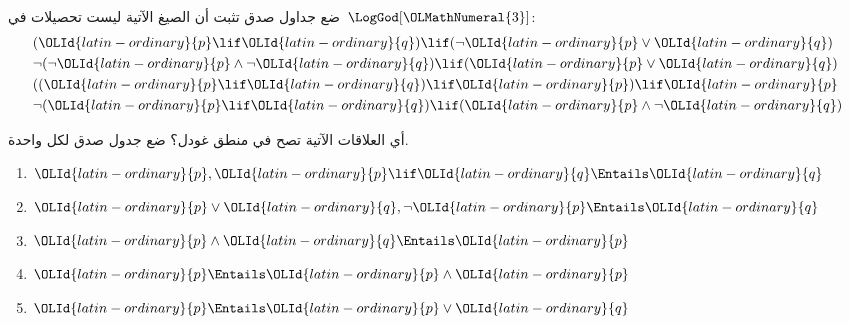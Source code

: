 \documentclass[../../../include/open-logic-section]{subfiles}
\begin{document}
\begin{prob}
  ضع جداول صدق تثبت أن الصيغ الآتية ليست تحصيلات في~$\LogGod[\OLMathNumeral{3}]$:
  \begin{align*}
    & (\OLId{latin-ordinary}{p} \lif \OLId{latin-ordinary}{q}) \lif (\lnot \OLId{latin-ordinary}{p} \lor \OLId{latin-ordinary}{q}) \\
    & \lnot(\lnot \OLId{latin-ordinary}{p} \land \lnot \OLId{latin-ordinary}{q}) \lif (\OLId{latin-ordinary}{p} \lor \OLId{latin-ordinary}{q}) \\
    & ((\OLId{latin-ordinary}{p} \lif \OLId{latin-ordinary}{q}) \lif \OLId{latin-ordinary}{p}) \lif \OLId{latin-ordinary}{p} \\
    & \lnot(\OLId{latin-ordinary}{p} \lif \OLId{latin-ordinary}{q}) \lif (\OLId{latin-ordinary}{p} \land \lnot \OLId{latin-ordinary}{q})
  \end{align*}
\end{prob}

\begin{prob}
  أي العلاقات الآتية تصح في منطق غودل؟ ضع جدول صدق لكل واحدة.
  \begin{enumerate}
    \item $\OLId{latin-ordinary}{p}, \OLId{latin-ordinary}{p} \lif \OLId{latin-ordinary}{q} \Entails \OLId{latin-ordinary}{q}$
    \item $\OLId{latin-ordinary}{p} \lor \OLId{latin-ordinary}{q}, \lnot \OLId{latin-ordinary}{p} \Entails \OLId{latin-ordinary}{q}$
    \item $\OLId{latin-ordinary}{p} \land \OLId{latin-ordinary}{q} \Entails \OLId{latin-ordinary}{p}$
    \item $\OLId{latin-ordinary}{p} \Entails \OLId{latin-ordinary}{p} \land \OLId{latin-ordinary}{p}$
    \item $\OLId{latin-ordinary}{p} \Entails \OLId{latin-ordinary}{p} \lor \OLId{latin-ordinary}{q}$
  \end{enumerate}
\end{prob}
\end{document}
